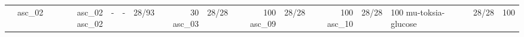 \begin{tabular}{lrrrrrrrrrr}
\toprule
 & asc_02 & asc_02 %
\midrule
asc_02 & - & - & 28/93 & 30%
asc_03 & 28/28 & 100%
asc_09 & 28/28 & 100%
asc_10 & 28/28 & 100%
mu-toksia-glucose & 28/28 & 100%
\bottomrule
\end{tabular}
